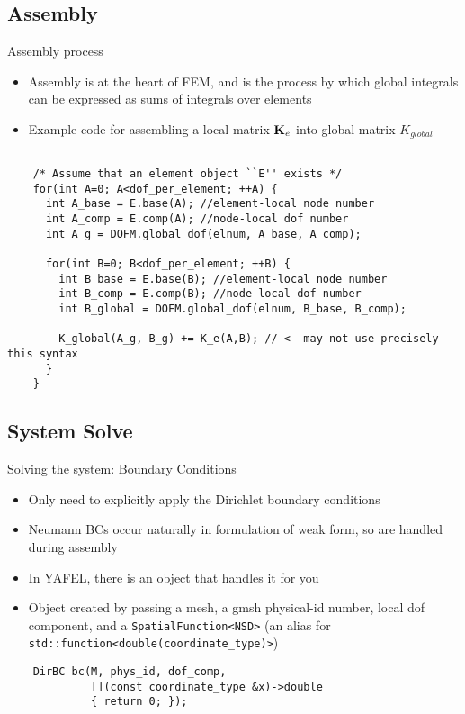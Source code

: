\subsection{Assembly}
\begin{frame}[fragile]{Assembly process}
  \begin{itemize}
  \item
    Assembly is at the heart of FEM, and is the process by which
    global integrals can be expressed as sums of integrals over elements
  \item
    Example code for assembling a local matrix $\mathbf{K}_e$ into 
    global matrix $K_{global}$
  \end{itemize}
  \begin{lstlisting}[basicstyle=\tiny\ttfamily]

    /* Assume that an element object ``E'' exists */
    for(int A=0; A<dof_per_element; ++A) {
      int A_base = E.base(A); //element-local node number
      int A_comp = E.comp(A); //node-local dof number
      int A_g = DOFM.global_dof(elnum, A_base, A_comp);

      for(int B=0; B<dof_per_element; ++B) {
        int B_base = E.base(B); //element-local node number
        int B_comp = E.comp(B); //node-local dof number
        int B_global = DOFM.global_dof(elnum, B_base, B_comp);
        
        K_global(A_g, B_g) += K_e(A,B); // <--may not use precisely this syntax
      }
    }
  \end{lstlisting}
\end{frame}

\subsection{System Solve}
\begin{frame}[fragile]{Solving the system: Boundary Conditions}
  \begin{itemize}
  \item
    Only need to explicitly apply the Dirichlet boundary conditions
  \item
    Neumann BCs occur naturally in formulation of weak form, so are
    handled during assembly
  \item
    In YAFEL, there is an object that handles it for you
  \item
    Object created by passing a mesh, a gmsh physical-id number, local dof component,
    and a \texttt{SpatialFunction<NSD>} 
    (an alias for \texttt{std::function<double(coordinate\_type)>})
  \end{itemize}
  \begin{lstlisting}
    DirBC bc(M, phys_id, dof_comp, 
             [](const coordinate_type &x)->double
             { return 0; });
  \end{lstlisting}
\end{frame}

